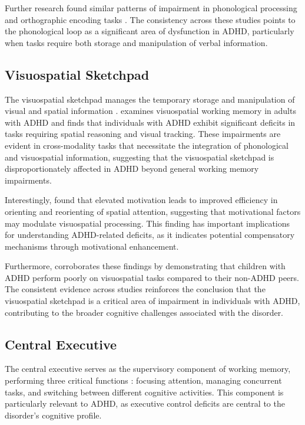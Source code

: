 \documentclass[stu]{apa7}
\begin{document}
Further research found similar patterns of impairment in phonological processing and orthographic encoding tasks \parencite{raiker_phonological_2019}. The consistency across these studies points to the phonological loop as a significant area of dysfunction in ADHD, particularly when tasks require both storage and manipulation of verbal information.

\subsection{Visuospatial Sketchpad}


The visuospatial sketchpad manages the temporary storage and manipulation of visual and spatial information \parencite{baddeley_developments_1994}. \textcite{butzbach_basic_2019} examines visuospatial working memory in adults with ADHD and finds that individuals with ADHD exhibit significant deficits in tasks requiring spatial reasoning and visual tracking. These impairments are evident in cross-modality tasks that necessitate the integration of phonological and visuospatial information, suggesting that the visuospatial sketchpad is disproportionately affected in ADHD beyond general working memory impairments.

Interestingly, \textcite{engelmann_motivation_2007} found that elevated motivation leads to improved efficiency in orienting and reorienting of spatial attention, suggesting that motivational factors may modulate visuospatial processing. This finding has important implications for understanding ADHD-related deficits, as it indicates potential compensatory mechanisms through motivational enhancement.

Furthermore, \textcite{elosua_differences_2017} corroborates these findings by demonstrating that children with ADHD perform poorly on visuospatial tasks compared to their non-ADHD peers. The consistent evidence across studies reinforces the conclusion that the visuospatial sketchpad is a critical area of impairment in individuals with ADHD, contributing to the broader cognitive challenges associated with the disorder.

\subsection{Central Executive}

The central executive serves as the supervisory component of working memory, performing three critical functions \parencite{baddeley_working_2012}: focusing attention, managing concurrent tasks, and switching between different cognitive activities. This component is particularly relevant to ADHD, as executive control deficits are central to the disorder's cognitive profile.
\end{document}
